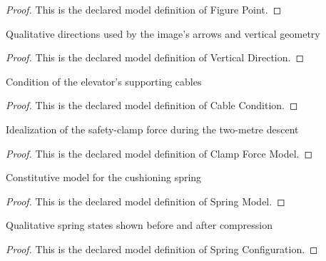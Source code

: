\begin{proof}
  This is the declared model definition of Figure Point.
\end{proof}
\begin{definition}
  \label{def:physics:phyx-mini-0814:phyxminiproblems-problemphyxmini0814-verticaldirection}
  Qualitative directions used by the image's arrows and vertical geometry
\end{definition}
\begin{proof}
  This is the declared model definition of Vertical Direction.
\end{proof}
\begin{definition}
  \label{def:physics:phyx-mini-0814:phyxminiproblems-problemphyxmini0814-cablecondition}
  Condition of the elevator's supporting cables
\end{definition}
\begin{proof}
  This is the declared model definition of Cable Condition.
\end{proof}
\begin{definition}
  \label{def:physics:phyx-mini-0814:phyxminiproblems-problemphyxmini0814-clampforcemodel}
  Idealization of the safety-clamp force during the two-metre descent
\end{definition}
\begin{proof}
  This is the declared model definition of Clamp Force Model.
\end{proof}
\begin{definition}
  \label{def:physics:phyx-mini-0814:phyxminiproblems-problemphyxmini0814-springmodel}
  Constitutive model for the cushioning spring
\end{definition}
\begin{proof}
  This is the declared model definition of Spring Model.
\end{proof}
\begin{definition}
  \label{def:physics:phyx-mini-0814:phyxminiproblems-problemphyxmini0814-springconfiguration}
  Qualitative spring states shown before and after compression
\end{definition}
\begin{proof}
  This is the declared model definition of Spring Configuration.
\end{proof}
